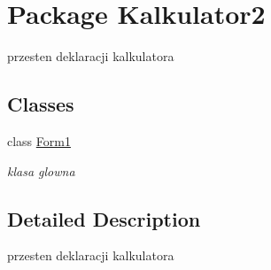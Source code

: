 \hypertarget{namespace_kalkulator2}{\section{Package Kalkulator2}
\label{namespace_kalkulator2}
}


przesten deklaracji kalkulatora  


\subsection*{Classes}
\begin{DoxyCompactItemize}
\item 
class \hyperlink{class_kalkulator2_1_1_form1}{Form1}
\begin{DoxyCompactList}\small\item\em klasa glowna \end{DoxyCompactList}\end{DoxyCompactItemize}


\subsection{Detailed Description}
przesten deklaracji kalkulatora 